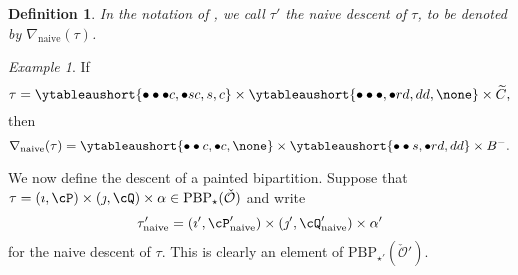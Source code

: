 \documentclass[12pt,a4paper]{amsart}
\newcommand{\CO}{{\mathcal {O}}}
\def\DD{\nabla}
\numberwithin{equation}{section}
\newtheorem{defn}[thm]{Definition}
\theoremstyle{remark}
\newtheorem*{Example}{Example}
\def\DDn{\DD_{\mathrm{naive}}}
\let\ytb=\ytableaushort
\begin{document}
\begin{defn}
 In the notation of , we call $\tau'$ the naive descent of $\tau$, to be denoted by $\DDn(\tau)$.
\end{defn}




 \begin{Example} If
    \[
     \tau = \ytb{\bullet\bullet\bullet {c},\bullet {s} {c},{s},{c}}
    \times \ytb{\bullet\bullet\bullet ,\bullet {r} {d},{d}{d}, \none}
    \times \widetilde C, \]
   then
   \[
    \nabla_{\mathrm{naive}}(\tau) =\ytb{\bullet\bullet{c} ,\bullet{c},\none }
    \times  \ytb{\bullet\bullet {s} ,\bullet {r} {d},{d}{d}}\times B^-.
    \]

\end{Example}

We now define the descent of a painted bipartition.
\label{sec:desc}
Suppose that
$
\tau=(\imath,\cP)\times(\jmath,\cQ)\times \alpha \in  \mathrm{PBP}_\star(\check \CO)
$
and write
\[
  \tau'_{\mathrm{naive}}=(\imath', \cP'_{\mathrm{naive}})\times (\jmath', \cQ'_{\mathrm{naive}})\times \alpha'
\]
for the naive descent of $\tau$. This is clearly an element of $  \mathrm{PBP}_{\star'}(\check \CO')$.
\end{document}
